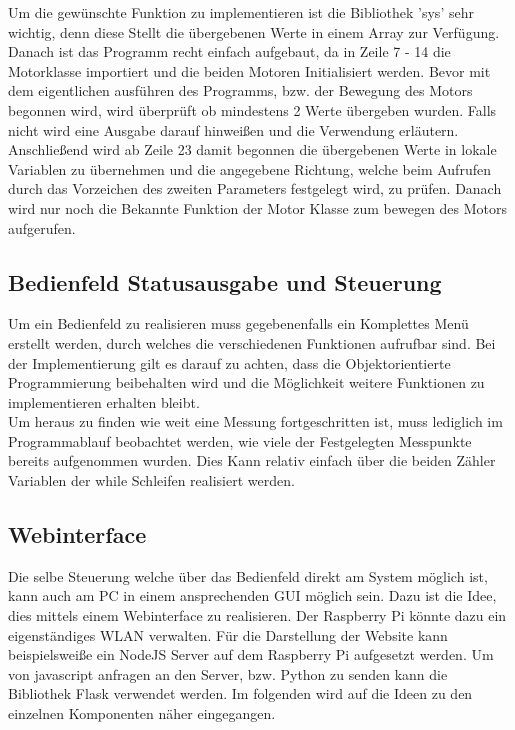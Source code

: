 Um die gewünschte Funktion zu implementieren ist die Bibliothek 'sys' sehr wichtig, denn diese Stellt die übergebenen Werte in einem Array zur Verfügung. Danach ist das Programm recht einfach aufgebaut, da in Zeile 7 - 14 die Motorklasse importiert und die beiden Motoren Initialisiert werden. Bevor mit dem eigentlichen ausführen des Programms, bzw. der Bewegung des Motors begonnen wird, wird überprüft ob mindestens 2 Werte übergeben wurden. Falls nicht wird eine Ausgabe darauf hinweißen und die Verwendung erläutern. \\
Anschließend wird ab Zeile 23 damit begonnen die übergebenen Werte in lokale Variablen zu übernehmen und die angegebene Richtung, welche beim Aufrufen durch das Vorzeichen des zweiten Parameters festgelegt wird, zu prüfen. Danach wird nur noch die Bekannte Funktion der Motor Klasse zum bewegen des Motors aufgerufen.

\subsection{Bedienfeld Statusausgabe und Steuerung}
Um ein Bedienfeld zu realisieren muss gegebenenfalls ein Komplettes Menü erstellt werden, durch welches die verschiedenen Funktionen aufrufbar sind. Bei der Implementierung gilt es darauf zu achten, dass die Objektorientierte Programmierung beibehalten wird und die Möglichkeit weitere Funktionen zu implementieren erhalten bleibt.\\
Um heraus zu finden wie weit eine Messung fortgeschritten ist, muss lediglich im Programmablauf beobachtet werden, wie viele der Festgelegten Messpunkte bereits aufgenommen wurden. Dies Kann relativ einfach über die beiden Zähler Variablen der while Schleifen realisiert werden. 

\subsection{Webinterface}
Die selbe Steuerung welche über das Bedienfeld direkt am System möglich ist, kann auch am PC in einem ansprechenden \ac{GUI} möglich sein. Dazu ist die Idee, dies mittels einem Webinterface zu realisieren. Der Raspberry Pi könnte dazu ein eigenständiges \ac{WLAN} verwalten. Für die Darstellung der Website kann beispielsweiße ein NodeJS Server auf dem Raspberry Pi aufgesetzt werden. Um von javascript anfragen an den Server, bzw. Python zu senden kann die Bibliothek Flask verwendet werden. Im folgenden wird auf die Ideen zu den einzelnen Komponenten näher eingegangen. 
